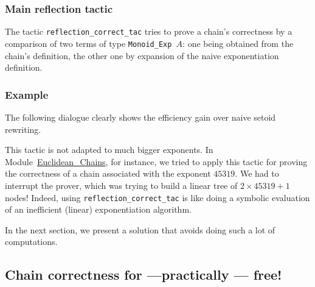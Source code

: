 
\subsubsection{Main reflection tactic}

The tactic \texttt{reflection\_correct\_tac} tries to prove a chain's 
correctness by a comparison of two terms of type \texttt{Monoid\_Exp $A$}:
one being obtained from the chain's definition, the other one by expansion
of the naive exponentiation definition.


\subsubsection{Example}
The following dialogue clearly shows the efficiency gain over naive setoid rewriting.



This tactic is not adapted to much bigger exponents. In \linebreak
 Module~\href{../theories/html/additions.Euclidean_Chains.html}{Euclidean\_Chains},
 for instance, we tried to apply this tactic for proving the correctness 
of a chain associated with the exponent $45319$. 
 We had to interrupt the prover, which 
was trying to build a linear tree of $2\times  45319 + 1$ nodes!
Indeed, using \texttt{reflection\_correct\_tac} is like doing a 
symbolic evaluation of an inefficient (linear) exponentiation algorithm.

In the next section, we present a solution that avoids doing such a lot of computations.

\subsection{Chain correctness for ---practically --- free!}
\label{correctness-for-free}


